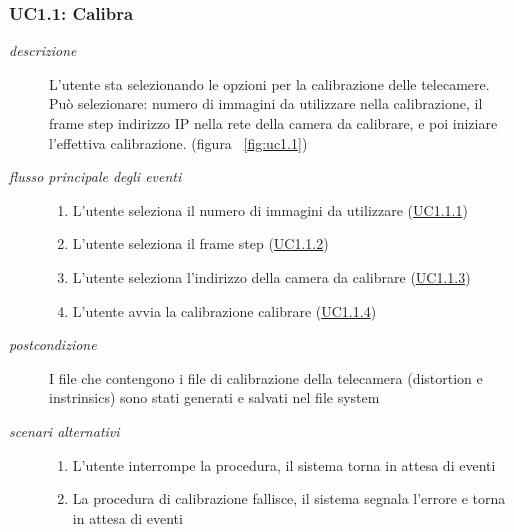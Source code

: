 \subsubsection{UC1.1: Calibra} \label{sec:UC1.1}
\begin{description}
\item[\em{descrizione }]L'utente sta selezionando le opzioni per la calibrazione delle telecamere. Può selezionare: numero di immagini da utilizzare nella calibrazione, il frame step indirizzo IP nella rete della camera da calibrare, e poi iniziare l'effettiva calibrazione.  (figura ~\ref{fig:uc1.1})
\item[\em{flusso principale degli eventi }] \mbox{}
 \begin{enumerate}
\item L'utente seleziona il numero di immagini da utilizzare (\hyperref[sec:uc1.1.1]{UC1.1.1})
\item L'utente seleziona il frame step (\hyperref[sec:uc1.1.2]{UC1.1.2})
\item L'utente seleziona l'indirizzo della camera da calibrare (\hyperref[sec:uc1.1.3]{UC1.1.3})
\item L'utente avvia la calibrazione calibrare (\hyperref[sec:uc1.1.4]{UC1.1.4})
\end{enumerate}
\item[\em{postcondizione }] I file che contengono i file di calibrazione della telecamera (distortion e instrinsics) sono stati generati e salvati nel file system
\item[\em{scenari alternativi }] \mbox{}

  \begin{enumerate}
\item L'utente interrompe la procedura, il sistema torna in attesa di eventi
\item La procedura di calibrazione fallisce, il sistema segnala l'errore e torna in attesa di eventi
\end{enumerate}
\end{description}


